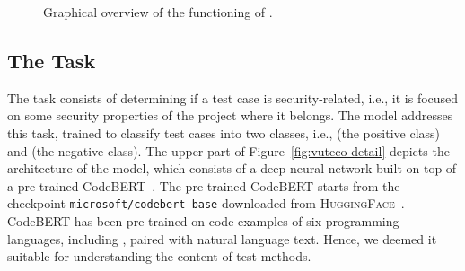 \begin{figure}[t]
    \centering
    \caption{Graphical overview of the functioning of \vuteco.}
    \label{fig:vuteco-overview}
\end{figure}


\subsection{The \finding Task}
\label{subsec:finding}

The \finding task consists of determining if a test case is security-related, i.e., it is focused on some security properties of the project where it belongs.
The \finder model addresses this task, trained to classify test cases into two classes, i.e., \finderPosClass (the positive class) and \finderNegClass (the negative class).
%
The upper part of Figure~\ref{fig:vuteco-detail} depicts the architecture of the \finder model, which consists of a deep neural network built on top of a pre-trained CodeBERT~\cite{feng:emnlp2020:codebert}.
The pre-trained CodeBERT starts from the checkpoint \texttt{microsoft/codebert-base} downloaded from \textsc{HuggingFace}~\cite{codebert:base:hf}.
CodeBERT has been pre-trained on
code examples of six programming languages, including \Java, paired with natural language text.
Hence,
we deemed it suitable for understanding the content of \JUnit test methods.

